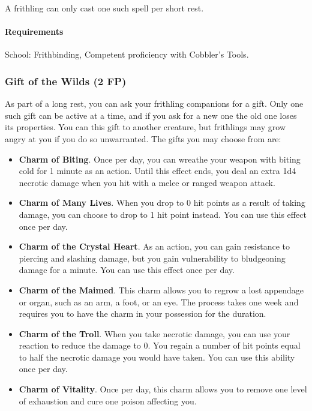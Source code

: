    A frithling can only cast one such spell per short rest.
    \paragraph{Requirements} School: Frithbinding, Competent proficiency with Cobbler's Tools.
\subsubsection{Gift of the Wilds (2 FP)} \label{feat::giftofthewilds}
    As part of a long rest, you can ask your frithling companions for a gift.
    Only one such gift can be active at a time, and if you ask for a new one the old one loses its properties.
    You can this gift to another creature, but frithlings may grow angry at you if you do so unwarranted.
    The gifts you may choose from are:
    \begin{itemize}
        \item \textbf{Charm of Biting}.
        Once per day, you can wreathe your weapon with biting cold for 1 minute as an action.
        Until this effect ends, you deal an extra 1d4 necrotic damage when you hit with a melee or ranged weapon attack.
        \item \textbf{Charm of Many Lives}.
        When you drop to 0 hit points as a result of taking damage, you can choose to drop to 1 hit point instead.
        You can use this effect once per day.
        \item \textbf{Charm of the Crystal Heart}.
        As an action, you can gain resistance to piercing and slashing damage, but you gain vulnerability to bludgeoning damage for a minute.
        You can use this effect once per day.
        \item \textbf{Charm of the Maimed}.
        This charm allows you to regrow a lost appendage or organ, such as an arm, a foot, or an eye.
        The process takes one week and requires you to have the charm in your possession for the duration.
        \item \textbf{Charm of the Troll}.
        When you take necrotic damage, you can use your reaction to reduce the damage to 0.
        You regain a number of hit points equal to half the necrotic damage you would have taken.
        You can use this ability once per day.
        \item \textbf{Charm of Vitality}.
        Once per day, this charm allows you to remove one level of exhaustion and cure one poison affecting you.
    \end{itemize}

